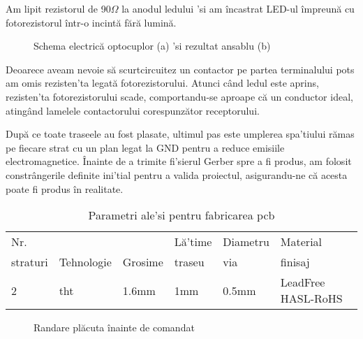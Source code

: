 Am lipit rezistorul de 90$\Omega$ la anodul ledului 'si am încastrat LED-ul împreună cu fotorezistorul într-o incintă fără lumină.

\begin{figure}[!ht]
\begin{center}
  \hfill
  \caption{Schema electrică optocuplor (a) 'si rezultat ansablu (b)}
  \label{fig:opto}
\end{center}
\end{figure}


Deoarece aveam nevoie să scurtcircuitez un contactor pe partea terminalului \acrshort{pots} am omis rezisten'ta legată fotorezistorului. Atunci când ledul este aprins, rezisten'ta fotorezistorului scade, comportandu-se aproape că un conductor ideal, atingând lamelele contactorului corespunzător receptorului.

După ce toate traseele au fost plasate, ultimul pas este umplerea spa'tiului rămas pe fiecare strat cu un plan legat la GND pentru a reduce emisiile electromagnetice. Înainte de a trimite fi'sierul Gerber spre a fi produs, am folosit constrângerile definite ini'tial pentru a valida proiectul, asigurandu-ne că acesta poate fi produs în realitate.

\begin{table}[ht!]
\begin{tabular}{llllll}
\hline
Nr. &  &  & Lă'time & Diametru & Material \\ 
straturi & Tehnologie & Grosime & traseu & via & finisaj \\
\hline
\hline
2 & \acrshort{tht} & 1.6mm & 1mm & 0.5mm & LeadFree HASL-RoHS\\
\hline
\end{tabular}
\centering
\caption{Parametri ale'si pentru fabricarea \acrshort{pcb}}
\label{tab:params}
\end{table}

\begin{figure}[!ht]
\begin{center}
  \hfill
  \caption{Randare plăcuta înainte de comandat}
  \label{fig:hat}
\end{center}
\end{figure}

